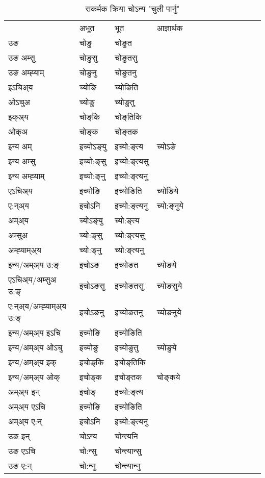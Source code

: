 \begin{table}[H]
\centering
\caption{\label{oŋ.vt} सकर्मक क्रिया  चोऽन्य  "चुली पार्नु"  }
\begin{tabular}{l|l|l|l|l|l|l|l|l|l|l|l|l}  \toprule
&अभूत & भूत & आज्ञार्थक \\ 
उङ &चोङु &चोङुत \\ 
उङ अम्सु &चोङुसु &चोङुतसु \\ 
उङ अम्ह्‍याम् &चोङुनु &चोङुतनु \\ 
इऽचिअ्य &च्योङि &च्योङिति   \\ 
ओऽचुअ &च्योङु &च्योङुतु   \\ 
इक्अ्य &चोङ्‌कि &चोङ्‌तिकि   \\ 
ओक्अ &चोङ्‌क &चोङ्‌तक   \\ 
इन्य अम् & इच्योऽङ्‌यु  & इच्यो:ङ्‌त्य &च्योऽङे  \\ 
इन्य अम्सु & इच्यो:ङ्‌सु  & इच्यो:ङ्‌त्यसु   \\ 
इन्य अम्ह्‍याम् & इच्यो:ङ्‌नु  & इच्यो:ङ्‌त्यनु   \\ 
एऽचिअ्य & इच्योङि & इच्योङिति &च्योङिये    \\ 
ए:न्अ्य & इचोऽनि  & इच्यो:ङ्‌त्यनु &च्यो:ङ्‌नुये  \\ 
अम्अ्य & च्योऽङ्‌यु  & च्यो:ङ्‌त्य  \\ 
अम्सुअ & च्यो:ङ्‌सु & च्यो:ङ्‌त्यसु  \\ 
अम्ह्‍याम्अ्य & च्यो:ङ्‌नु  & च्यो:ङ्‌त्यनु \\ 
\midrule
इन्य/अम्अ्य उ:ङ्‌&इचोऽङ & इच्योङत &च्योङये \\ 
एऽचिअ्य/अम्सुअ उ:ङ्‌ &इचोऽङसु & इच्योङतसु &च्योङसुये \\ 
ए:न्अ्य/अम्ह्‍याम्अ्य उ:ङ्‌ &इचोऽङनु & इच्योङतनु &च्योङनुये \\ 
इन्य/अम्अ्य इऽचि & इच्योङि & इच्योङिति    \\ 
इन्य/अम्अ्य ओऽचु & इच्योङु & इच्योङुतु  &च्योङुये  \\ 
इन्य/अम्अ्य इक् & इचोङ्‌कि & इचोङ्‌तिकि   \\ 
इन्य/अम्अ्य ओक् & इचोङ्‌क & इचोङ्‌तक  &चोङ्‌कये  \\ 
अम्अ्य इन् & इचोङ्‌ & इच्यो:ङ्‌त्य   \\ 
अम्अ्य एऽचि & इच्योङि & इच्योङिति    \\ 
अम्अ्य ए:न् & इचोऽनि  & इच्यो:ङ्‌त्यनु  \\ 
\midrule
उङ इन् & चोऽन्य  & चोन्त्यनि  \\ 
उङ एऽचि & चो:न्सु  & चोन्त्यान्सु   \\ 
उङ ए:न्& चो:न्‍नु  & चोन्त्यान्‍नु   \\ 
\bottomrule
\end{tabular}
\end{table}


